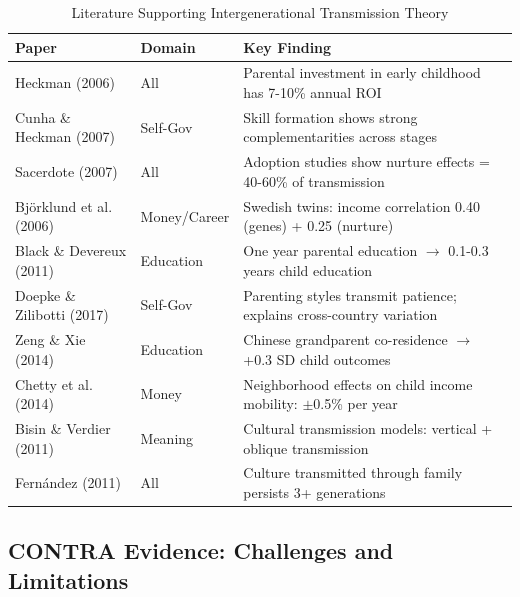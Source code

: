 \begin{table}[htbp]
\centering
\caption{Literature Supporting Intergenerational Transmission Theory}
\label{tab:BI-pro-evidence}
\renewcommand{\arraystretch}{1.3}
\footnotesize
\begin{tabular}{@{}p{3.5cm}lp{5cm}@{}}
\toprule
\textbf{Paper} & \textbf{Domain} & \textbf{Key Finding} \\
\midrule
Heckman (2006) & All & Parental investment in early childhood has 7-10\% annual ROI \\
Cunha \& Heckman (2007) & Self-Gov & Skill formation shows strong complementarities across stages \\
Sacerdote (2007) & All & Adoption studies show nurture effects = 40-60\% of transmission \\
Björklund et al. (2006) & Money/Career & Swedish twins: income correlation 0.40 (genes) + 0.25 (nurture) \\
Black \& Devereux (2011) & Education & One year parental education $\rightarrow$ 0.1-0.3 years child education \\
Doepke \& Zilibotti (2017) & Self-Gov & Parenting styles transmit patience; explains cross-country variation \\
Zeng \& Xie (2014) & Education & Chinese grandparent co-residence $\rightarrow$ +0.3 SD child outcomes \\
Chetty et al. (2014) & Money & Neighborhood effects on child income mobility: $\pm$0.5\% per year \\
Bisin \& Verdier (2011) & Meaning & Cultural transmission models: vertical + oblique transmission \\
Fernández (2011) & All & Culture transmitted through family persists 3+ generations \\
\bottomrule
\end{tabular}
\end{table}

\subsection{CONTRA Evidence: Challenges and Limitations}

